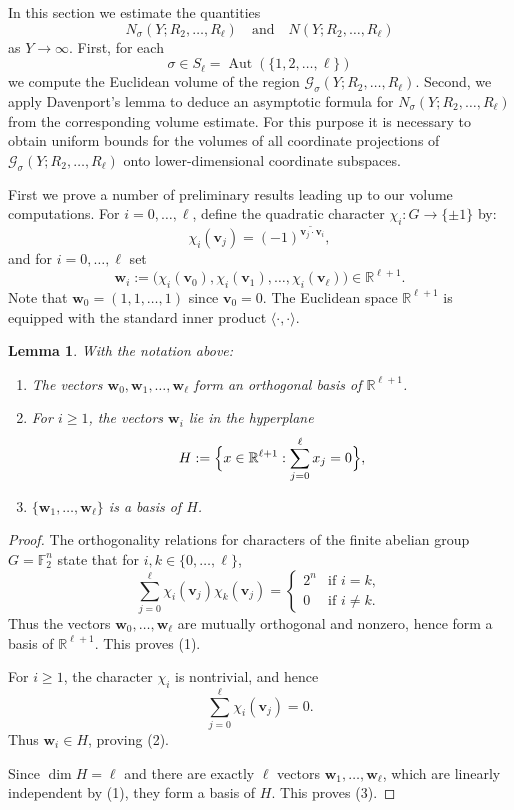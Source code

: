 \documentclass{amsart}
\newcommand{\F}{\mathbb{F}}
\newcommand{\op}[1]{\operatorname{#1}}
\newcommand{\R}{\mathbb{R}}
\theoremstyle{plain}
\newtheorem{lemma}[theorem]{Lemma}
\theoremstyle{definition}
\theoremstyle{remark}
\numberwithin{equation}{section}
\begin{document}
In this section we estimate the quantities
\[
N_\sigma(Y;R_2,\dots,R_\ell)
\quad\text{and}\quad
N(Y;R_2,\dots,R_\ell)
\]
as $Y\to\infty$. First, for each \[\sigma\in S_{\ell}=\op{Aut}\left(\{1, 2,\dots, \ell\}\right)\]we compute the Euclidean volume of the region 
\(
\mathcal G_\sigma(Y;R_2,\dots,R_\ell).
\)
Second, we apply Davenport's lemma to deduce an asymptotic formula for
\(
N_\sigma(Y;R_2,\dots,R_\ell)
\)
from the corresponding volume estimate. For this purpose it is necessary to obtain uniform bounds for the volumes of all coordinate projections of 
\(
\mathcal G_\sigma(Y;R_2,\dots,R_\ell)
\)
onto lower-dimensional coordinate subspaces. 
\par First we prove a number of preliminary results leading up to our volume computations. For $i=0,\dots,\ell$, define the quadratic character $\chi_i:G\rightarrow \{\pm 1\}$ by:
\[
\chi_i(\mathbf v_j)
=
(-1)^{\widetilde{\mathbf v_j\cdot \mathbf v_i}},
\]
and for $i=0,\dots,\ell$ set
\[
\mathbf w_i
:=
\bigl(
\chi_i(\mathbf v_0),
\chi_i(\mathbf v_1),
\dots,
\chi_i(\mathbf v_\ell)
\bigr)
\in \R^{\ell+1}.
\] Note that $\mathbf w_0=(1,1,\dots, 1)$ since $\mathbf v_0=0$. The Euclidean space $\mathbb{R}^{\ell+1}$ is equipped with the standard inner product $\langle\cdot, \cdot\rangle$. 

\begin{lemma}\label{lemma:character-basis}
With the notation above:

\begin{enumerate}
\item The vectors $\mathbf w_0,\mathbf w_1,\dots,\mathbf w_\ell$
form an orthogonal basis of $\R^{\ell+1}$.

\item For $i\ge 1$, the vectors $\mathbf w_i$ lie in the hyperplane
\[
H
:=
\Bigl\{
x\in\R^{\ell+1} :
\sum_{j=0}^{\ell} x_j = 0
\Bigr\},
\]

\item $\{\mathbf w_1,\dots,\mathbf w_\ell\}$
is a basis of $H$.
\end{enumerate}
\end{lemma}

\begin{proof}
The orthogonality relations for characters of the finite abelian group
$G=\F_2^n$ state that for $i,k\in\{0,\dots,\ell\}$,
\[
\sum_{j=0}^{\ell}
\chi_i(\mathbf v_j)\chi_k(\mathbf v_j)
=
\begin{cases}
2^n & \text{if } i=k, \\
0 & \text{if } i\ne k.
\end{cases}
\]
Thus the vectors $\mathbf w_0,\dots,\mathbf w_\ell$
are mutually orthogonal and nonzero, hence form a basis of $\R^{\ell+1}$.
This proves (1).

For $i\ge1$, the character $\chi_i$ is nontrivial, and hence
\[
\sum_{j=0}^{\ell} \chi_i(\mathbf v_j)=0.
\]
Thus $\mathbf w_i\in H$, proving (2).

Since $\dim H = \ell$ and there are exactly $\ell$
vectors $\mathbf w_1,\dots,\mathbf w_\ell$,
which are linearly independent by (1),
they form a basis of $H$.
This proves (3).
\end{proof}
\end{document}
